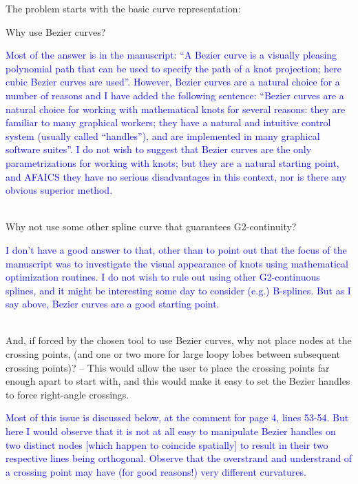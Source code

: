 \documentclass[12pt]{article}
\begin{document}
The problem starts with the basic curve representation:

Why use Bezier curves? 

\textcolor{blue}{Most of the answer is in the manuscript: ``A Bezier
  curve is a visually pleasing polynomial path that can be used to
  specify the path of a knot projection; here cubic Bezier curves are
  used''.  However, Bezier curves are a natural choice for a number of
  reasons and I have added the following sentence: ``Bezier curves are
  a natural choice for working with mathematical knots for several
  reasons: they are familiar to many graphical workers; they have a
  natural and intuitive control system (usually called ``handles''),
  and are implemented in many graphical software suites''.  I do not
  wish to suggest that Bezier curves are the only parametrizations for
  working with knots; but they are a natural starting point, and
  AFAICS they have no serious disadvantages in this context, nor is
  there any obvious superior method.\\ \\}

Why not use some other spline curve that guarantees G2-continuity?

\textcolor{blue}{I don't have a good answer to that, other than to
  point out that the focus of the manuscript was to investigate the
  visual appearance of knots using mathematical optimization routines.
  I do not wish to rule out using other G2-continuous splines, and it
  might be interesting some day to consider (e.g.) B-splines.  But as
  I say above, Bezier curves are a good starting point.\\ \\}

And, if forced by the chosen tool to use Bezier curves, why not place
nodes at the crossing points, (and one or two more for large loopy
lobes between subsequent crossing points)?  -- This would allow the
user to place the crossing points far enough apart to start with, and
this would make it easy to set the Bezier handles to force right-angle
crossings.

\textcolor{blue}{Most of this issue is discussed below, at the comment
  for page 4, lines 53-54.  But here I would observe that it is not at
  all easy to manipulate Bezier handles on two distinct nodes [which
    happen to coincide spatially] to result in their two respective
  lines being orthogonal.  Observe that the overstrand and understrand
  of a crossing point may have (for good reasons!) very different
  curvatures.\\ \\}
\end{document}
